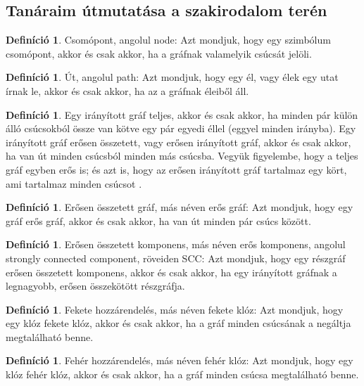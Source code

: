 \documentclass[
]{thesis-ekf}
\theoremstyle{definition}
\newtheorem{definicio}[tetel]{Definíció}
\theoremstyle{remark}
\begin{document}
	\subsection{Tanáraim útmutatása a szakirodalom terén} \label{ssec-szakirodalom}
	\begin{definicio}
		Csomópont, angolul node: Azt mondjuk, hogy egy szimbólum csomópont, akkor és csak akkor, ha a gráfnak valamelyik csúcsát jelöli.
	\end{definicio}
	\begin{definicio}
		Út, angolul path: Azt mondjuk, hogy egy él, vagy élek egy utat írnak le, akkor és csak akkor, ha az a gráfnak éleiből áll.
	\end{definicio}
	\begin{definicio}
		Egy irányított gráf teljes, akkor és csak akkor, ha minden pár külön álló csúcsokból össze van kötve egy pár egyedi éllel (eggyel minden irányba). Egy irányított gráf erősen összetett, vagy erősen irányított gráf, akkor és csak akkor, ha van út minden csúcsból minden más csúcsba. Vegyük figyelembe, hogy a teljes gráf egyben erős is; és azt is, hogy az erősen irányított gráf tartalmaz egy kört, ami tartalmaz minden csúcsot \cite{am}.
	\end{definicio}

	\begin{definicio}
		Erősen összetett gráf, más néven erős gráf: Azt mondjuk, hogy egy gráf erős gráf, akkor és csak akkor, ha van út minden pár csúcs között.
	\end{definicio}
	
	\begin{definicio}
		Erősen összetett komponens, más néven erős komponens, angolul strongly connected component, röveiden \textsc{SCC}: Azt mondjuk, hogy egy részgráf erősen összetett komponens, akkor és csak akkor, ha egy irányított gráfnak a legnagyobb, erősen összekötött részgráfja.
	\end{definicio}
	
	\begin{definicio}
		Fekete hozzárendelés, más néven fekete klóz: Azt mondjuk, hogy egy klóz fekete klóz, akkor és csak akkor, ha a gráf minden csúcsának a negáltja megtalálható benne.
	\end{definicio}
	
	\begin{definicio}
		Fehér hozzárendelés, más néven fehér klóz: Azt mondjuk, hogy egy klóz fehér klóz, akkor és csak akkor, ha a gráf minden csúcsa megtalálható benne.
	\end{definicio}
\end{document}

